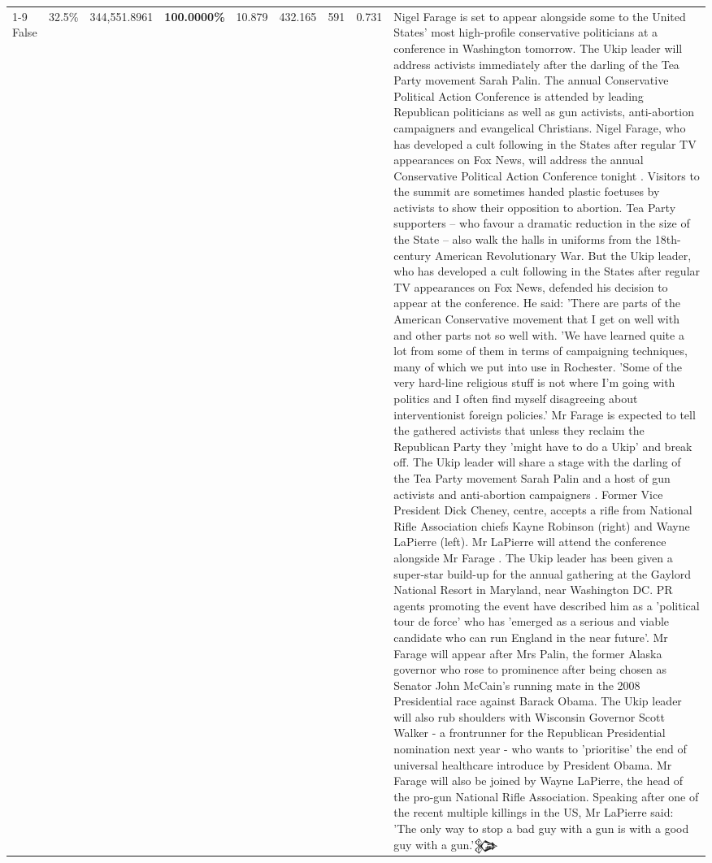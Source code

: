 \begin{table}[H]
\begin{tabular}{lllrlllll}
\cline{1-9}
False & 32.5\% & 344,551.8961 & \bfseries \color{red} 100.0000\% & 10.879 & 432.165 & 591 & 0.731 & Nigel Farage is set to appear alongside some to the United States' most high-profile conservative politicians at a conference in Washington tomorrow. The Ukip leader will address activists immediately after the darling of the Tea Party movement Sarah Palin. The annual Conservative Political Action Conference is attended by leading Republican politicians as well as gun activists, anti-abortion campaigners and evangelical Christians. Nigel Farage, who has developed a cult following in the States after regular TV appearances on Fox News, will address the annual Conservative Political Action Conference tonight . Visitors to the summit are sometimes handed plastic foetuses by activists to show their opposition to abortion. Tea Party supporters – who favour a dramatic reduction in the size of the State – also walk the halls in uniforms from the 18th-century American Revolutionary War. But the Ukip leader, who has developed a cult following in the States after regular TV appearances on Fox News, defended his decision to appear at the conference. He said: 'There are parts of the American Conservative movement that I get on well with and other parts not so well with. 'We have learned quite a lot from some of them in terms of campaigning techniques, many of which we put into use in Rochester. 'Some of the very hard-line religious stuff is not where I'm going with politics and I often find myself disagreeing about interventionist foreign policies.' Mr Farage is expected to tell the gathered activists that unless they reclaim the Republican Party they 'might have to do a Ukip' and break off. The Ukip leader will share a stage with the darling of the Tea Party movement Sarah Palin and a host of gun activists and anti-abortion campaigners . Former Vice President Dick Cheney, centre, accepts a rifle from National Rifle Association chiefs Kayne Robinson (right) and Wayne LaPierre (left). Mr LaPierre will attend the conference alongside Mr Farage . The Ukip leader has been given a super-star build-up for the annual gathering at the Gaylord National Resort in Maryland, near Washington DC. PR agents promoting the event have described him as a 'political tour de force' who has 'emerged as a serious and viable candidate who can run England in the near future'. Mr Farage will appear after Mrs Palin, the former Alaska governor who rose to prominence after being chosen as Senator John McCain's running mate in the 2008 Presidential race against Barack Obama. The Ukip leader will also rub shoulders with Wisconsin Governor Scott Walker - a frontrunner for the Republican Presidential nomination next year - who wants to 'prioritise' the end of universal healthcare introduce by President Obama. Mr Farage will also be joined by Wayne LaPierre, the head of the pro-gun National Rifle Association. Speaking after one of the recent multiple killings in the US, Mr LaPierre said: 'The only way to stop a bad guy with a gun is with a good guy with a gun.'𒉰 \\

\end{tabular}
\end{table}
